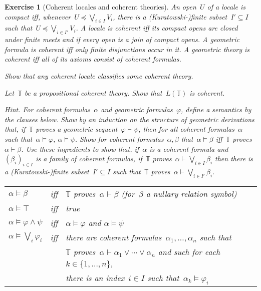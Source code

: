 \documentclass{ws-rv9x6}
\newtheorem{ex}{Exercise}
\newenvironment{exercise}[1]{
  \begin{ex}[#1]
}{\end{ex}}
\newcommand{\TT}{\mathbb{T}}
\renewcommand{\_}{\mathpunct{.}}
\newcommand{\?}{\,{:}\,}
\begin{document}
\begin{exercise}{Coherent locales and coherent theories}%
\label{ex:coherent}%
An open~$U$ of a locale is \emph{compact} iff, whenever~$U
\preceq \bigvee_{i \in I} V_i$, there is a (Kuratowski-)finite subset~$I'
\subseteq I$ such that~$U \preceq \bigvee_{i \in I'} V_i$. A locale is
\emph{coherent} iff its compact opens are closed under finite meets and if
every open is a join of compact opens. A geometric formula is \emph{coherent} iff only
finite disjunctions occur in it. A geometric theory is \emph{coherent}
iff all of its axioms consist of coherent formulas.
\begin{alphlist}[(d)]
\item Show that any coherent locale classifies some coherent theory.
\item Let~$\TT$ be a propositional coherent theory. Show that~$L(\TT)$ is
coherent.\smallskip

{\scriptsize\emph{Hint.} For coherent formulas~$\alpha$ and geometric
formulas~$\varphi$, define a semantics by the clauses below. Show by an induction on the
structure of geometric derivations that, if~$\TT$ proves a geometric
sequent~$\varphi \vdash \psi$, then for all coherent formulas~$\alpha$ such
that~$\alpha \models \varphi$, $\alpha \models \psi$. Show for coherent
formulas~$\alpha,\beta$ that~$\alpha \models \beta$ iff~$\TT$ proves~$\alpha
\vdash \beta$. Use these ingredients to show that, if~$\alpha$ is a coherent
formula and~$(\beta_i)_{i \in I}$ is a family of coherent formulas, if~$\TT$
proves~$\alpha \vdash \bigvee_{i \in I} \beta_i$ then there is a
(Kuratowski-)finite subset~$I' \subseteq I$ such that~$\TT$ proves~$\alpha
\vdash \bigvee_{i \in I'} \beta_i$.

\begin{center}\tablefont
\begin{tabular}{@{}l@{\ \ }c@{\ \ }l@{}}
  $\alpha \models \beta$ &iff& $\TT$ proves~$\alpha \vdash \beta$ \qquad(for~$\beta$ a nullary relation symbol) \\
  $\alpha \models \top$ &iff& true \\
  $\alpha \models \varphi \wedge \psi$ &iff& $\alpha \models \varphi$ and $\alpha \models \psi$ \\
  $\alpha \models \bigvee_i \varphi_i$ &iff& there are coherent
  formulas~$\alpha_1,\ldots,\alpha_n$ such that \\ &&\qquad $\TT$ proves~$\alpha \vdash
  \alpha_1 \vee \cdots \vee \alpha_n$ and such for each~$k \in \{1,\ldots,n\}$,
  \\ &&\qquad\qquad there is an index~$i \in I$ such that~$\alpha_k \models \varphi_i$
\end{tabular}
\end{center}}


\end{alphlist}
\end{exercise}
\end{document}
